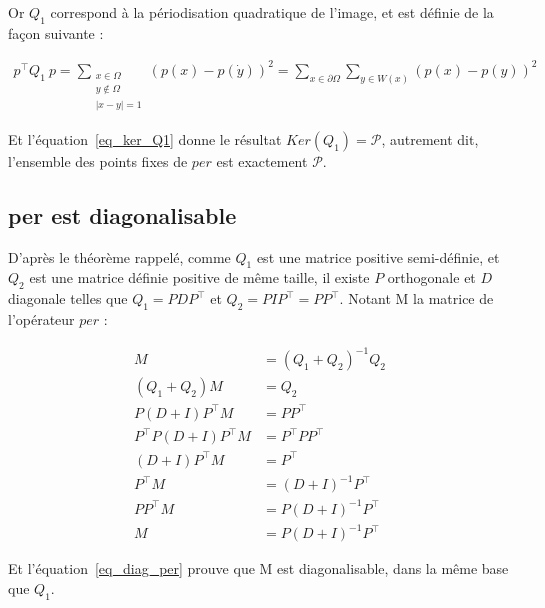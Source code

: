 \documentclass[12pt,a4paper,onecolumn]{article}
\begin{document}
Or \(Q_1\) correspond à la périodisation quadratique de l'image, et est définie de la façon suivante :

\begin{equation}
	\begin{split}
		p^{\intercal}Q_1~p = \sum_{\substack{x \in \Omega\\y \not\in \Omega\\|x-y| = 1}} (p(x) - p(\dot y))^2 = \sum_{x \in \partial\Omega}\sum_{y \in W(x)} (p(x) - p(y))^2
	\end{split}
	\label{eq_ker_Q1}
\end{equation}

Et l'équation~\eqref{eq_ker_Q1} donne le résultat \(Ker(Q_1) = \mathcal{P}\), autrement dit, l'ensemble des points fixes de \(per\) est exactement \(\mathcal{P}\).

\subsection{per est diagonalisable}


D'après le théorème rappelé, comme \(Q_1\) est une matrice positive semi-définie, et \(Q_2\) est une matrice définie positive de même taille, il existe \(P\) orthogonale et \(D\) diagonale telles que \(Q_1 = PDP^{\intercal}\) et \(Q_2 = PIP^{\intercal} = PP^{\intercal}\). Notant M la matrice de l'opérateur \(per\) :

\begin{equation}
	\begin{split}
		M &= \left(Q_1 + Q_2\right)^{-1}Q_2\\
		\left(Q_1 + Q_2\right)M &= Q_2\\
		P\left(D + I\right)P^{\intercal} M &= PP^{\intercal}\\
		P^{\intercal}P\left(D + I\right)P^{\intercal} M &= P^{\intercal}PP^{\intercal}\\
		\left(D + I\right)P^{\intercal} M &= P^{\intercal}\\
		P^{\intercal} M &= \left(D + I\right)^{-1}P^{\intercal}\\
		PP^{\intercal} M &= P\left(D + I\right)^{-1}P^{\intercal}\\
		M &= P\left(D + I\right)^{-1}P^{\intercal}
	\end{split}
	\label{eq_diag_per}
\end{equation}

Et l'équation~\eqref{eq_diag_per} prouve que M est diagonalisable, dans la même base que \(Q_1\).
\end{document}
